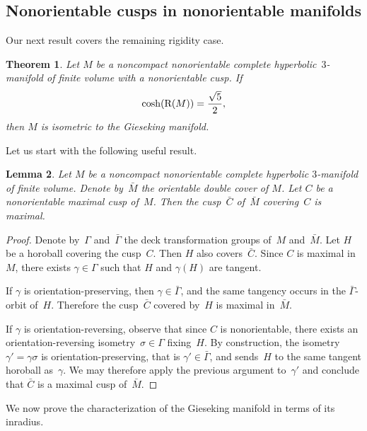 \documentclass[11pt,reqno]{amsart}
\newtheorem{theorem}{Theorem}[section]
\newtheorem{lemma}[theorem]{Lemma}
\theoremstyle{definition}
\numberwithin{equation}{section}
\newcommand\RR{{\rm R}}
\numberwithin{equation}{section}
\begin{document}
\forgotten





\subsection{Nonorientable cusps in nonorientable manifolds}

Our next result covers the remaining rigidity case.

\begin{theorem} \label{theo:nonorientable_cusp}
Let $M$ be a noncompact nonorientable complete hyperbolic~$3$-manifold of finite volume with a nonorientable cusp.
If
\[
\cosh(\RR(M))  = \frac{\sqrt{5}}{2},
\]
then $M$ is isometric to the Gieseking manifold.
\end{theorem}


Let us start with the following useful result.

\begin{lemma} \label{lem:C-bar}
Let $M$ be a noncompact nonorientable complete hyperbolic $3$-manifold of finite volume.
Denote by~$\bar{M}$ the orientable double cover of $M$.
Let $C$ be a nonorientable maximal cusp of~$M$.
Then the cusp~$\bar{C}$ of~$\bar{M}$ covering~$C$ is maximal.
\end{lemma}

\begin{proof}
Denote by~$\Gamma$ and~$\bar{\Gamma}$ the deck transformation groups of~$M$ and~$\bar{M}$.
Let $H$ be a horoball covering the cusp~$C$.
Then $H$ also covers~$\bar{C}$.
Since $C$ is maximal in~$M$, there exists $\gamma \in \Gamma$ such that $H$ and $\gamma(H)$ are tangent.

If $\gamma$ is orientation-preserving, then $\gamma \in \bar{\Gamma}$, and the same tangency occurs in the
$\bar{\Gamma}$-orbit of~$H$.
Therefore the cusp~$\bar C$ covered by~$H$ is maximal in~$\bar{M}$.

If $\gamma$ is orientation-reversing, observe that since $C$ is nonorientable, there exists an orientation-reversing isometry~$\sigma \in \Gamma$ fixing~$H$.
By construction, the isometry~$\gamma'=\gamma \sigma$ is orientation-preserving, that is $\gamma' \in \bar{\Gamma}$, and sends~$H$ to the same tangent horoball as~$\gamma$.
We may therefore apply the previous argument to~$\gamma'$ and conclude that $\bar{C}$ is a maximal cusp of~$\bar{M}$.
\end{proof}

We now prove the characterization of the Gieseking manifold in terms of its inradius.
\end{document}

